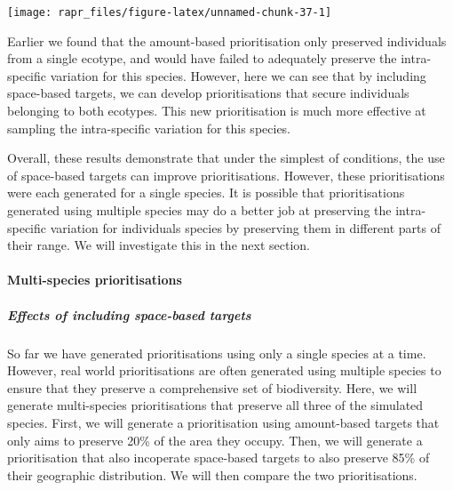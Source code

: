 \documentclass[11pt,]{article}
\let\origfigure\figure
\let\endorigfigure\endfigure
\renewenvironment{figure}[1][2] {
	\expandafter\origfigure\expandafter[H]
} {
	\endorigfigure
}
\begin{document}
\begin{figure}

{\centering \texttt{[image: rapr\_files/figure-latex/unnamed-chunk-37-1]} 

}

\caption{Difference between two prioritisations for the bimodally distributed species. See Figure 7 caption for conventions.}\label{fig:unnamed-chunk-37}
\end{figure}

Earlier we found that the amount-based prioritisation only preserved
individuals from a single ecotype, and would have failed to adequately
preserve the intra-specific variation for this species. However, here we
can see that by including space-based targets, we can develop
prioritisations that secure individuals belonging to both ecotypes. This
new prioritisation is much more effective at sampling the intra-specific
variation for this species.

Overall, these results demonstrate that under the simplest of
conditions, the use of space-based targets can improve prioritisations.
However, these prioritisations were each generated for a single species.
It is possible that prioritisations generated using multiple species may
do a better job at preserving the intra-specific variation for
individuals species by preserving them in different parts of their
range. We will investigate this in the next section.

\paragraph{Multi-species
prioritisations}\label{multi-species-prioritisations}

\subparagraph{Effects of including space-based
targets}\label{effects-of-including-space-based-targets}

So far we have generated prioritisations using only a single species at
a time. However, real world prioritisations are often generated using
multiple species to ensure that they preserve a comprehensive set of
biodiversity. Here, we will generate multi-species prioritisations that
preserve all three of the simulated species. First, we will generate a
prioritisation using amount-based targets that only aims to preserve
20\% of the area they occupy. Then, we will generate a prioritisation
that also incoperate space-based targets to also preserve 85\% of their
geographic distribution. We will then compare the two prioritisations.
\end{document}
